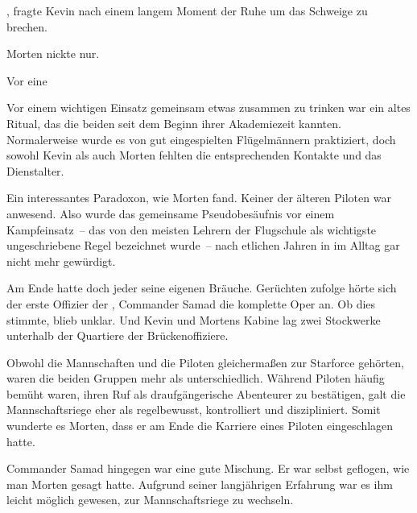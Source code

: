 \par

, fragte Kevin nach einem langem Moment der Ruhe um das Schweige zu brechen.

\par

Morten nickte nur.

\par

Vor eine

\par

Vor einem wichtigen Einsatz gemeinsam etwas zusammen zu trinken war ein altes Ritual, das die beiden seit dem Beginn ihrer Akademiezeit kannten. Normalerweise wurde es von gut eingespielten Flügelmännern praktiziert, doch sowohl Kevin als auch Morten fehlten die entsprechenden Kontakte und das Dienstalter.

\par

Ein interessantes Paradoxon, wie Morten fand. Keiner der älteren Piloten war anwesend. Also wurde das gemeinsame Pseudobesäufnis vor einem Kampfeinsatz~-- das von den meisten Lehrern der Flugschule als wichtigste ungeschriebene Regel bezeichnet wurde~-- nach etlichen Jahren in im Alltag gar nicht mehr gewürdigt.

\par

Am Ende hatte doch jeder seine eigenen Bräuche. Gerüchten zufolge hörte sich der erste Offizier der , Commander Samad die komplette Oper  an. Ob dies stimmte, blieb unklar. Und Kevin und Mortens Kabine lag zwei Stockwerke unterhalb der Quartiere der Brückenoffiziere.

\par

Obwohl die Mannschaften und die Piloten gleichermaßen zur Starforce gehörten, waren die beiden Gruppen mehr als unterschiedlich. Während Piloten häufig bemüht waren, ihren Ruf als draufgängerische Abenteurer zu bestätigen, galt die Mannschaftsriege eher als regelbewusst, kontrolliert und diszipliniert. Somit wunderte es Morten, dass er am Ende die Karriere eines Piloten eingeschlagen hatte.

\par

Commander Samad hingegen war eine gute Mischung. Er war selbst geflogen, wie man Morten gesagt hatte. Aufgrund seiner langjährigen Erfahrung war es ihm leicht möglich gewesen, zur Mannschaftsriege zu wechseln.

